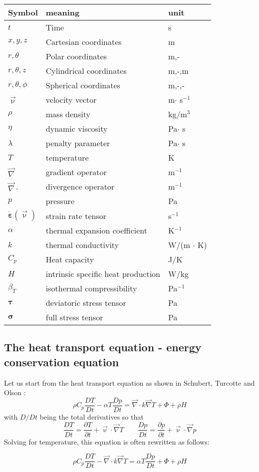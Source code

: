 
\begin{center}
\begin{tabular}{lll}
\hline
Symbol & meaning & unit \\
\hline
\hline
$t$ & Time & s \\
$x,y,z$ & Cartesian coordinates & m \\
$r,\theta$ & Polar coordinates & m,-\\
$r,\theta, z$ & Cylindrical coordinates & m,-,m\\
$r,\theta,\phi$ & Spherical coordinates & m,-,- \\
${\vec \upnu}$ & velocity vector & m$\cdot$ s$^{-1}$\\
$\rho$ & mass density & kg/m$^3$ \\
$\eta$ & dynamic viscosity &  Pa$\cdot$ s \\
$\lambda$ & penalty parameter & Pa$\cdot$ s \\
$T$ & temperature & K \\
${\vec \nabla}$ & gradient operator & m$^{-1}$ \\
${\vec \nabla}\cdot$ & divergence operator & m$^{-1}$ \\
$p$ & pressure & Pa\\
$\dot{\bm \varepsilon}({\vec \upnu})$ & strain rate tensor & s$^{-1}$ \\
$\alpha$ & thermal expansion coefficient & K$^{-1}$ \\
$k$ & thermal conductivity & W/(m $\cdot$ K) \\
$C_p$ & Heat capacity & J/K \\
$H$ & intrinsic specific heat production & W/kg\\
$\beta_T$ & isothermal compressibility & Pa$^{-1}$  \\
${\bm \tau}$ & deviatoric stress tensor & Pa \\
${\bm \sigma}$ & full stress tensor & Pa \\
\hline
\end{tabular}
\end{center}

\subsection{The heat transport equation - energy conservation equation}

Let us start from the heat transport equation as shown in Schubert, Turcotte and Olson \cite{scto01}:
\[
\rho C_p \frac{DT}{Dt} - \alpha T \frac{Dp}{Dt} = {\vec \nabla} \cdot k {\vec \nabla} T + \Phi + \rho H  
\]
with $D/Dt$ being the total derivatives so that 
\[
\frac{DT}{Dt} = \frac{\partial T}{\partial t} + {\vec \upnu}\cdot {\vec \nabla}T
\quad\quad
\frac{Dp}{Dt} = \frac{\partial p}{\partial t} + {\vec \upnu}\cdot {\vec \nabla}p
\]
Solving for temperature, this equation is often rewritten as follows:
\begin{mdframed}[backgroundcolor=blue!5]
\[
\rho C_p \frac{DT}{Dt} - {\vec \nabla} \cdot k {\vec \nabla} T =  \alpha T \frac{Dp}{Dt} + \Phi + \rho H  
\]
\end{mdframed}

